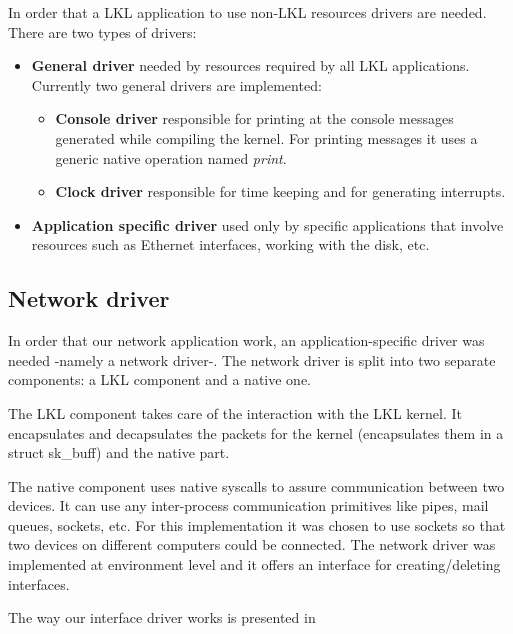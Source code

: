 In order that a LKL application to use non-LKL resources drivers are needed. There are two types of drivers:
\begin{itemize}
\item \textbf{General driver} needed by resources required by all LKL applications. Currently two general drivers are implemented:
\begin{itemize}
\item \textbf{Console driver} responsible for printing at the console messages generated while compiling the kernel. For printing messages it uses a generic native operation named \textit{print}.
\item \textbf{Clock driver} responsible for time keeping and for generating interrupts.
\end{itemize}
\item \textbf{Application specific driver} used only by specific applications that involve resources such as Ethernet interfaces, working with the disk, etc.
\end{itemize}

\subsection{Network driver}
\label{sec:net-driver}
In order that our network application work, an application-specific driver was needed -namely a network driver-. 
The network driver is split into two separate components: a LKL component and a native one.

The LKL component takes care of the interaction with the LKL kernel. It encapsulates
and decapsulates the packets for the kernel (encapsulates them in a struct sk_buff)
and the native part.

The native component uses native syscalls to assure communication between two devices.
It can use any inter-process communication primitives like pipes, mail queues, sockets, etc.
For this implementation it was chosen to use sockets so that two devices on different computers could be connected.
The network driver was implemented at environment level and it offers an interface for creating/deleting interfaces.

The way our interface driver works is presented in 

